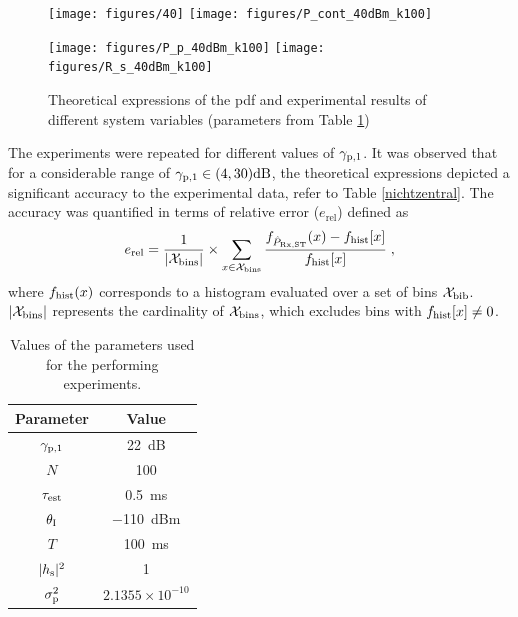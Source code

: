 \begin{figure}
	\centering
	\texttt{[image: figures/40]}%
	\texttt{[image: figures/P\_cont\_40dBm\_k100]}%
	
	\texttt{[image: figures/P\_p\_40dBm\_k100]}%
	\texttt{[image: figures/R\_s\_40dBm\_k100]}%
	\caption{Theoretical expressions of the pdf and experimental results of different system variables (parameters from Table \ref{param})}
	\label{hrel_pdf}
\end{figure}

The experiments were repeated for different values of ${\gamma}_{\text{p,1}}$. It was observed that for a considerable range of ${\gamma}_{\text{p,1}} \in (4,30)\SI{}{dB}$, the theoretical expressions depicted a significant accuracy to the experimental data, refer to Table \ref{nichtzentral}. The accuracy was quantified in terms of relative error ($e_\textrm{rel}$) defined as
\begin{equation}
\label{fr}
e_\textrm{rel} = \frac{1}{|\mathcal X_{\text{bins}}|} \times \sum_{x \in \mathcal X_{\text{bins}}} \frac{f_{\hat{P}_{\text{Rx,ST}}}(x) - f_{\text{hist}}[x]}{f_{\text{hist}}[x]} \;  , 
\end{equation}
where $f_{\text{hist}}(x)$ corresponds to a histogram evaluated over a set of bins $\mathcal X_{\text{bib}}$. $|\mathcal X_{\text{bins}}|$ represents the cardinality of $\mathcal X_{\text{bins}}$, which excludes bins with $f_{\text{hist}}[x] \neq 0$. 

\begin{table}
	\renewcommand{\arraystretch}{1.4}
	\centering
	\caption{Values of the parameters used for the performing experiments.}
	\label{param}
	\begin{tabular}{c||c}
		\bfseries Parameter & \bfseries Value \\ \hline \hline
		${\gamma}_{\text{p,1}}$ & \SI{22}{dB} \\
		$N$ & 100 \\
		$\tau_{\text{est}}$ & \SI{0.5}{ms}\\
		$\theta_{\text{I}}$ & \SI{-110}{dBm}\\
		$T$ & \SI{100}{ms}\\
		$|h_{\text{s}}|^2$ & 1 \\
		$\sigma^2_{\text{p}}$ & $2.1355\times10^{-10}$\\ \hline
	\end{tabular}
\end{table}

